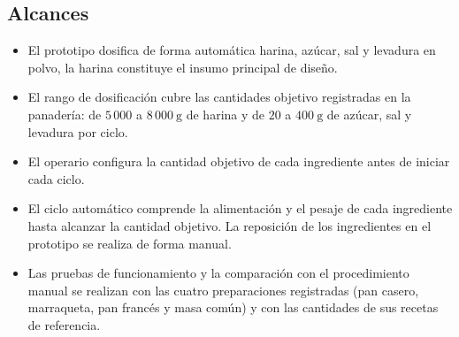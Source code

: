 \subsection{Alcances}
\label{subsec:alcances}

\begin{itemize}

    \item El prototipo dosifica de forma automática harina, azúcar, sal y
    levadura en polvo, la harina constituye el insumo principal de diseño.

    \item El rango de dosificación cubre las cantidades objetivo
    registradas en la panadería: de $5\,000$ a $8\,000\ \mathrm{g}$ de
    harina y de $20$ a $400\ \mathrm{g}$ de azúcar, sal y levadura por
    ciclo.

    \item El operario configura la cantidad objetivo de cada ingrediente
    antes de iniciar cada ciclo.

    \item El ciclo automático comprende la alimentación y el pesaje de cada
    ingrediente hasta alcanzar la cantidad objetivo. La reposición de los
    ingredientes en el prototipo se realiza de forma manual.

    \item Las pruebas de funcionamiento y la comparación con el
    procedimiento manual se realizan con las cuatro preparaciones
    registradas (pan casero, marraqueta, pan francés y masa común) y con
    las cantidades de sus recetas de referencia.

\end{itemize}

\clearpage
\flushbottom
